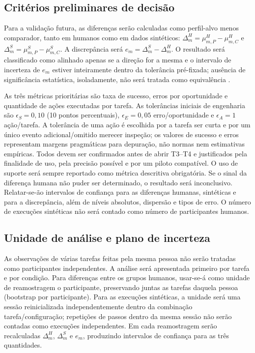 \documentclass[conference]{IEEEtran}
\begin{document}
\subsection{Critérios preliminares de decisão}

Para a validação futura, as diferenças serão calculadas como perfil-alvo menos comparador, tanto em humanos como em dados sintéticos: $\Delta^H_m=\mu^H_{m,P}-\mu^H_{m,C}$ e $\Delta^S_m=\mu^S_{m,P}-\mu^S_{m,C}$. A discrepância será $e_m=\Delta^S_m-\Delta^H_m$. O resultado será classificado como alinhado apenas se a direção for a mesma e o intervalo de incerteza de $e_m$ estiver inteiramente dentro da tolerância pré-fixada; ausência de significância estatística, isoladamente, não será tratada como equivalência \cite{lakens2017,dix2004}.

As três métricas prioritárias são taxa de sucesso, erros por oportunidade e quantidade de ações executadas por tarefa. As tolerâncias iniciais de engenharia são $\epsilon_S=0,10$ (10 pontos percentuais), $\epsilon_E=0,05$ erro/oportunidade e $\epsilon_A=1$ ação/tarefa. A tolerância de uma ação é escolhida por a tarefa ser curta e por um único evento adicional/omitido merecer inspeção; os valores de sucesso e erros representam margens pragmáticas para depuração, não normas nem estimativas empíricas. Todos devem ser confirmados antes de abrir T3--T4 e justificados pela finalidade de uso, pela precisão possível e por um piloto compatível. O uso de suporte será sempre reportado como métrica descritiva obrigatória. Se o sinal da diferença humana não puder ser determinado, o resultado será inconclusivo. Relatar-se-ão intervalos de confiança para as diferenças humanas, sintéticas e para a discrepância, além de níveis absolutos, dispersão e tipos de erro. O número de execuções sintéticas não será contado como número de participantes humanos.
\subsection{Unidade de análise e plano de incerteza}

As observações de várias tarefas feitas pela mesma pessoa não serão tratadas como participantes independentes. A análise será apresentada primeiro por tarefa e por condição. Para diferenças entre os grupos humanos, usar-se-á como unidade de reamostragem o participante, preservando juntas as tarefas daquela pessoa (bootstrap por participante). Para as execuções sintéticas, a unidade será uma sessão reinicializada independentemente dentro da combinação tarefa/configuração; repetições de passos dentro da mesma sessão não serão contadas como execuções independentes. Em cada reamostragem serão recalculadas $\Delta^H_m$, $\Delta^S_m$ e $e_m$, produzindo intervalos de confiança para as três quantidades.
\end{document}
